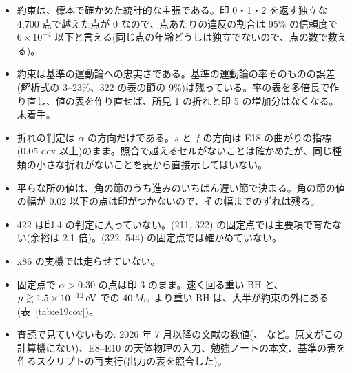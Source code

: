 \begin{caveat}
\begin{itemize}
\item 約束は、標本で確かめた統計的な主張である。印 0・1・2 を返す独立な 4{,}700 点で越えた点が 0 なので、点あたりの違反の割合は 95\% の信頼度で $6\times10^{-4}$ 以下と言える(同じ点の年齢どうしは独立でないので、点の数で数える)。
\item 約束は基準の運動論への忠実さである。基準の運動論の率そのものの誤差(解析式の 3--23\%、322 の表の節の 9\%)は残っている。率の表を多倍長で作り直し、値の表を作り直せば、所見 1 の折れと印 5 の増加分はなくなる。未着手。
\item 折れの判定は $\alpha$ の方向だけである。$s$ と $f$ の方向は E18 の曲がりの指標(0.05 dex 以上)のまま。照合で越えるセルがないことは確かめたが、同じ種類の小さな折れがないことを表から直接示してはいない。
\item 平らな所の値は、角の節のうち進みのいちばん遅い節で決まる。角の節の値の幅が 0.02 以下の点は印がつかないので、その幅までのずれは残る。
\item 422 は印 4 の判定に入っていない。(211, 322) の固定点では主要項で育たない(余裕は 2.1 倍)。(322, 544) の固定点では確かめていない。
\item x86 の実機では走らせていない。
\item 固定点で $\alpha>0.30$ の点は印 3 のまま。速く回る重い BH と、$\mu\gtrsim1.5\times10^{-12}\,\mathrm{eV}$ での $40\,M_\odot$ より重い BH は、大半が約束の外にある(表~\ref{tab:e19cov})。
\item 査読で見ていないもの: 2026 年 7 月以降の文献の数値(、 など。原文がこの計算機にない)、E8--E10 の天体物理の入力、勉強ノートの本文、基準の表を作るスクリプトの再実行(出力の表を照合した)。
\end{itemize}
\end{caveat}
